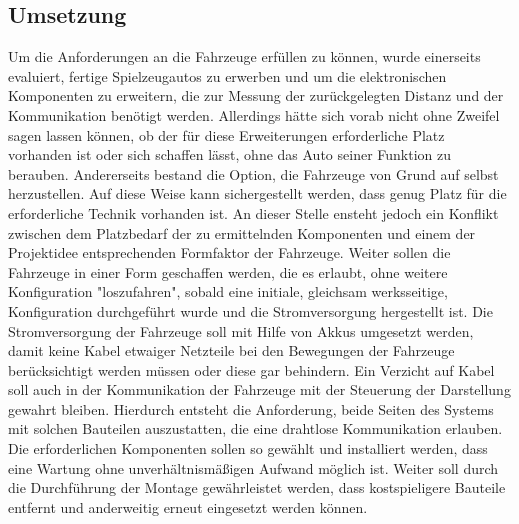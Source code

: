 \documentclass[.../Dokumentation.tex]{subfiles}
\begin{document}
\subsection{Umsetzung}\label{sec-concept-execution}
Um die Anforderungen an die Fahrzeuge erfüllen zu können, wurde 
einerseits evaluiert, fertige Spielzeugautos zu erwerben und um die 
elektronischen Komponenten zu erweitern, die zur Messung der zurückgelegten 
Distanz und der Kommunikation benötigt werden. Allerdings hätte sich vorab 
nicht ohne Zweifel sagen lassen können, ob der für diese Erweiterungen 
erforderliche Platz vorhanden ist oder sich schaffen lässt, ohne das Auto 
seiner Funktion zu berauben. 
Andererseits bestand die Option, die Fahrzeuge von 
Grund auf selbst herzustellen. 
Auf diese Weise kann sichergestellt werden, 
dass genug Platz für die erforderliche Technik vorhanden ist.
An dieser Stelle ensteht jedoch ein Konflikt zwischen dem Platzbedarf der zu 
ermittelnden Komponenten und 
einem der Projektidee entsprechenden Formfaktor der Fahrzeuge.
Weiter sollen die Fahrzeuge in einer Form geschaffen werden, die es erlaubt, 
ohne weitere Konfiguration "loszufahren", sobald eine initiale, 
gleichsam werksseitige, Konfiguration durchgeführt wurde und die 
Stromversorgung hergestellt ist. 
Die Stromversorgung der Fahrzeuge soll mit Hilfe von Akkus umgesetzt werden, 
damit keine Kabel etwaiger Netzteile bei den Bewegungen der Fahrzeuge 
berücksichtigt werden müssen oder diese gar behindern.
Ein Verzicht auf Kabel soll auch in der Kommunikation der Fahrzeuge mit 
der Steuerung der Darstellung gewahrt bleiben.
Hierdurch entsteht die Anforderung, beide Seiten des Systems mit solchen 
Bauteilen auszustatten, die eine drahtlose Kommunikation erlauben.
Die erforderlichen Komponenten sollen so gewählt und installiert werden, 
dass eine Wartung ohne unverhältnismäßigen Aufwand möglich ist. Weiter soll 
durch die Durchführung der Montage gewährleistet werden, dass kostspieligere 
Bauteile entfernt und anderweitig erneut eingesetzt werden können.
\end{document}
